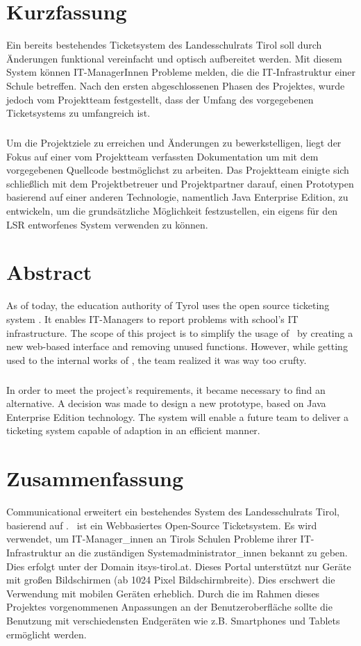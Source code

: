 \chapter*{Kurzfassung}
Ein bereits bestehendes Ticketsystem des Landesschulrats Tirol soll durch Änderungen funktional vereinfacht und optisch aufbereitet werden. Mit diesem System können IT-ManagerInnen Probleme melden, die die IT-Infrastruktur einer Schule betreffen. Nach den ersten abgeschlossenen Phasen des Projektes, wurde jedoch vom Projektteam festgestellt, dass der Umfang des vorgegebenen Ticketsystems zu umfangreich ist.
\paragraph{}
Um die Projektziele zu erreichen und Änderungen zu bewerkstelligen, liegt der Fokus auf einer vom Projektteam verfassten Dokumentation um mit dem vorgegebenen Quellcode bestmöglichst zu arbeiten.
Das Projektteam einigte sich schließlich mit dem Projektbetreuer \getSteff und Projektpartner \getHammerl darauf, einen Prototypen basierend auf einer anderen Technologie, namentlich Java Enterprise Edition, zu entwickeln, um die grundsätzliche Möglichkeit festzustellen, ein eigens für den LSR entworfenes System verwenden zu können.

\chapter*{Abstract}
As of today, the education authority of Tyrol uses the open source ticketing system \getOst. It enables IT-Managers to report problems with school’s IT infrastructure. The scope of this project is to simplify the usage of \getOst\ by creating a new web-based interface and removing unused functions. However, while getting used to the internal works of \getOst, the team realized it was way too crufty.
\paragraph{}
In order to meet the project’s requirements, it became necessary to find an alternative. A decision was made to design a new prototype, based on Java Enterprise Edition technology. The  system will enable a future team to deliver a ticketing system capable of adaption in an efficient manner.


\chapter*{Zusammenfassung}
Communicational erweitert ein bestehendes System des Landesschulrats Tirol, basierend auf \getOst. \getOst\ ist ein Webbasiertes Open-Source Ticketsystem. Es wird verwendet, um IT-Manager\_innen an Tirols Schulen Probleme ihrer IT-Infrastruktur an die zuständigen Systemadministrator\_innen bekannt zu geben. Dies erfolgt unter der Domain itsys-tirol.at. Dieses Portal unterstützt nur Geräte mit großen Bildschirmen (ab 1024 Pixel Bildschirmbreite). Dies erschwert die Verwendung mit mobilen Geräten erheblich. Durch die im Rahmen dieses Projektes vorgenommenen Anpassungen an der Benutzeroberfläche sollte die Benutzung mit verschiedensten Endgeräten wie z.B. Smartphones und Tablets ermöglicht werden.
